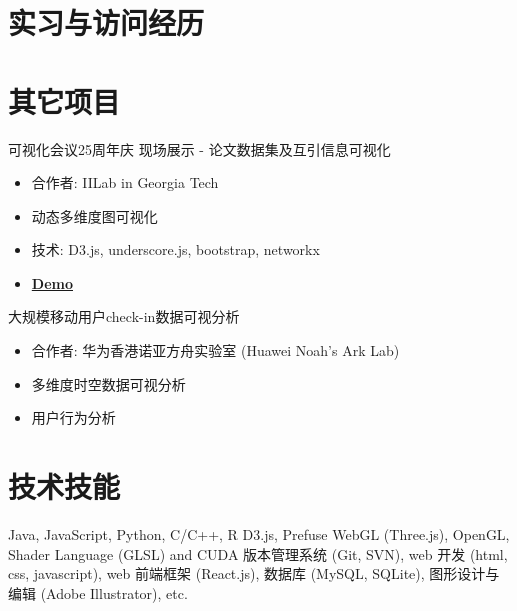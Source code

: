 \documentclass[10pt,a4paper,roman]{moderncv} %
\begin{document}
\vspace{0.2cm}

\section{实习与访问经历}


\section{其它项目}
 {可视化会议25周年庆 现场展示 - 论文数据集及互引信息可视化
	\begin{itemize}
	\item 合作者: IILab in Georgia Tech
	\item 动态多维度图可视化
	\item 技术: D3.js, underscore.js, bootstrap, networkx
	\item \href{http://www.cc.gatech.edu/gvu/ii/citevis/VIS25/}{\textbf{Demo}}
	\end{itemize}
}

 {大规模移动用户check-in数据可视分析
	\begin{itemize}
	\item 合作者: 华为香港诺亚方舟实验室 (Huawei Noah's Ark Lab)
	\item 多维度时空数据可视分析
	\item 用户行为分析
	\end{itemize}
}


\section{技术技能}

 {Java, JavaScript, Python, C/C++, R}
 {D3.js, Prefuse}
 {WebGL (Three.js), OpenGL, Shader Language (GLSL) and CUDA}
 {版本管理系统 (Git, SVN), web 开发 (html, css, javascript), web 前端框架 (React.js), 数据库 (MySQL, SQLite), 图形设计与编辑 (Adobe Illustrator), etc.}


\end{document}
